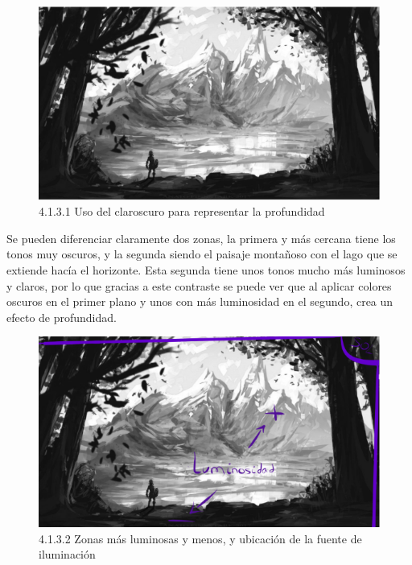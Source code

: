 \documentclass[12pt]{article}
\begin{document}
        
    \begin{figure}[H]
      \centering
      \includegraphics[scale=0.4]{images/Nerea/Nerea Zelda concept 131.PNG}
      \caption{\small 4.1.3.1 Uso del claroscuro para representar la profundidad}
    \end{figure}

    Se pueden diferenciar claramente dos zonas, la primera y más cercana tiene los tonos muy oscuros, y la segunda siendo el paisaje montañoso con el lago que se extiende hacía el horizonte. Esta segunda tiene unos tonos mucho más luminosos y claros, por lo que gracias a este contraste se puede ver que al aplicar colores oscuros en el primer plano y unos con más luminosidad en el segundo, crea un efecto de profundidad.

    \begin{figure}[H]
      \centering
      \includegraphics[scale=0.4]{images/Nerea/Nerea Zelda concept 132.PNG}
      \caption{\small 4.1.3.2 Zonas más luminosas y menos, y ubicación de la fuente de iluminación}
    \end{figure}
\end{document}
